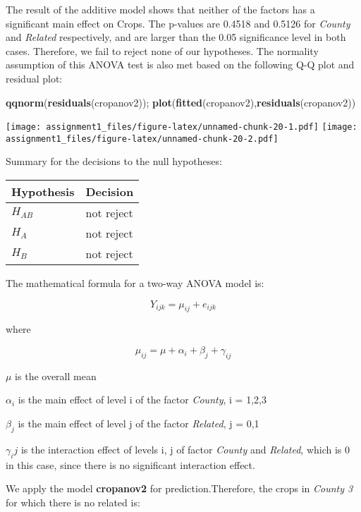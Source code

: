 \documentclass[
]{article}
\newenvironment{Shaded}{\begin{snugshade}}{\end{snugshade}}
\newcommand{\FunctionTok}[1]{\textcolor[rgb]{0.13,0.29,0.53}{\textbf{#1}}}
\newcommand{\NormalTok}[1]{#1}
\begin{document}
The result of the additive model shows that neither of the factors has a
significant main effect on Crops. The p-values are 0.4518 and 0.5126 for
\emph{County} and \emph{Related} respectively, and are larger than the
0.05 significance level in both cases. Therefore, we fail to reject none
of our hypotheses. The normality assumption of this ANOVA test is also
met based on the following Q-Q plot and residual plot:

\begin{Shaded}
\begin{Highlighting}[]
\FunctionTok{qqnorm}\NormalTok{(}\FunctionTok{residuals}\NormalTok{(cropanov2)); }\FunctionTok{plot}\NormalTok{(}\FunctionTok{fitted}\NormalTok{(cropanov2),}\FunctionTok{residuals}\NormalTok{(cropanov2))}
\end{Highlighting}
\end{Shaded}

\texttt{[image: assignment1\_files/figure-latex/unnamed-chunk-20-1.pdf]}
\texttt{[image: assignment1\_files/figure-latex/unnamed-chunk-20-2.pdf]}

Summary for the decisions to the null hypotheses:

\begin{longtable}[]{@{}ll@{}}
\toprule\noalign{}
Hypothesis & Decision \\
\midrule\noalign{}
\endhead
\bottomrule\noalign{}
\endlastfoot
\(H_{AB}\) & not reject \\
\(H_{A}\) & not reject \\
\(H_{B}\) & not reject \\
\end{longtable}

The mathematical formula for a two-way ANOVA model is:

\[
Y_{ijk} = \mu_{ij} + e_{ijk}
\]

where

\[
\mu_{ij} = \mu + \alpha_i + \beta_j + \gamma_{ij}
\]

\(\mu\) is the overall mean

\(\alpha_i\) is the main effect of level i of the factor \emph{County},
i = 1,2,3

\(\beta_j\) is the main effect of level j of the factor \emph{Related},
j = 0,1

\(\gamma_ij\) is the interaction effect of levels i, j of factor
\emph{County} and \emph{Related}, which is 0 in this case, since there
is no significant interaction effect.

We apply the model \textbf{cropanov2} for prediction.Therefore, the
crops in \emph{County 3} for which there is no related is:
\end{document}
